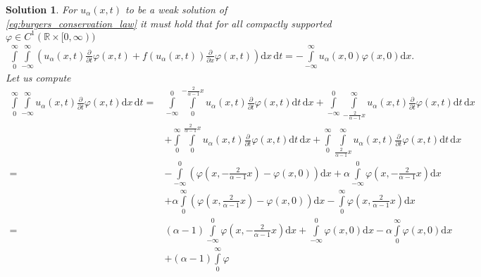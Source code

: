 \documentclass[10pt,letterpaper]{article}
\theoremstyle{break}
\newtheorem{solution}{Solution}
\begin{document}
\begin{solution}
	For $u_\alpha(x,t)$ to be a weak solution of
	\eqref{eq:burgers_conservation_law} it must hold that
	for all compactly supported $\varphi \in C^1(\mathbb{R} \times [0,\infty))$
	\begin{align}
		\int\limits_{0}^{\infty}
		\int\limits_{-\infty}^{\infty}
		\left(
			u_\alpha(x,t)
			\frac{\partial}{\partial t} \varphi(x,t)
			+
			f(u_\alpha(x,t))
			\frac{\partial}{\partial x} \varphi(x,t)
		\right)
		\text{d}x\, \text{d}t
		=
		-
		\int\limits_{-\infty}^{\infty}
		u_\alpha(x,0)
		\varphi(x,0) 
		\text{d}x.
	\end{align} 
	Let us compute
	\begin{equation}\label{eq:int_dt}
	\begin{aligned}
		\int\limits_{0}^{\infty}
		\int\limits_{-\infty}^{\infty}
		u_\alpha(x,t)
		\frac{\partial}{\partial t} \varphi(x,t)
		\text{d}x\, \text{d}t
		=
		&
		\int\limits_{-\infty}^{0}
		\int\limits_{0}^{-\frac{2}{\alpha-1}x}
		u_\alpha(x,t)
		\frac{\partial}{\partial t} \varphi(x,t)
		\text{d}t\, \text{d}x
		+
		\int\limits_{-\infty}^{0}
		\int\limits_{-\frac{2}{\alpha-1}x}^{\infty}
		u_\alpha(x,t)
		\frac{\partial}{\partial t} \varphi(x,t)
		\text{d}t\, \text{d}x \\
		&
		+
		\int\limits_{0}^{\infty}
		\int\limits_{0}^{\frac{2}{\alpha-1}x}
		u_\alpha(x,t)
		\frac{\partial}{\partial t} \varphi(x,t)
		\text{d}t\, \text{d}x
		+
		\int\limits_{0}^{\infty}
		\int\limits_{\frac{2}{\alpha-1}x}^{\infty}
		u_\alpha(x,t)
		\frac{\partial}{\partial t} \varphi(x,t)
		\text{d}t\, \text{d}x \\
		=
		&
		-
		\int\limits_{-\infty}^{0}
		\left(
			\varphi
			\left(x,-\frac{2}{\alpha-1}x\right)
			-
			\varphi(x,0)
		\right)
		\text{d}x
		+
		\alpha
		\int\limits_{-\infty}^{0}
		\varphi
		\left(x,-\frac{2}{\alpha-1}x\right)
		\text{d}x \\
		&
		+
		\alpha
		\int\limits_{0}^{\infty}
		\left(
			\varphi
			\left(x,\frac{2}{\alpha-1}x\right)
			-
			\varphi(x,0)
		\right)
		\text{d}x
		-
		\int\limits_{0}^{\infty}
		\varphi
		\left(x,\frac{2}{\alpha-1}x\right) 
		\text{d}x \\
		=
		&
		(\alpha-1)
		\int\limits_{-\infty}^{0}
		\varphi
		\left(x,-\frac{2}{\alpha-1}x\right)
		\text{d}x
		+
		\int\limits_{-\infty}^{0}
		\varphi
		\left(x,0\right)
		\text{d}x
		-\alpha
		\int\limits_{0}^{\infty}
		\varphi
		\left(x,0\right)
		\text{d}x \\
		&
		+
		(\alpha-1)
		\int\limits_{0}^{\infty}
		\varphi

\end{aligned}
\end{equation}
\end{solution}
\end{document}
